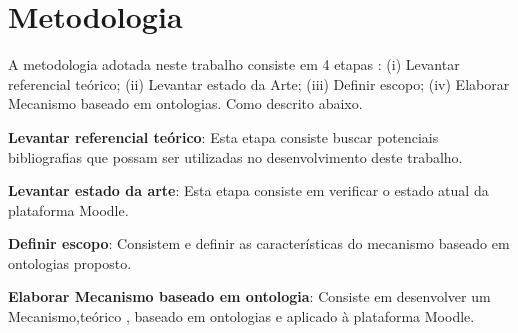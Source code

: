\section{Metodologia}
A metodologia adotada neste trabalho consiste em 4 etapas : (i) Levantar referencial teórico; (ii) Levantar estado da Arte; (iii) Definir  escopo; (iv) Elaborar  Mecanismo baseado em ontologias. Como descrito abaixo.

\textbf{Levantar referencial teórico}:
Esta etapa consiste buscar potenciais bibliografias que possam ser utilizadas no desenvolvimento deste trabalho. 

\textbf{Levantar estado da arte}: 
Esta etapa consiste em verificar o estado atual da plataforma Moodle.

\textbf{Definir escopo}: 
Consistem e definir as características do mecanismo baseado em ontologias proposto.

\textbf{Elaborar Mecanismo baseado em ontologia}:
Consiste em desenvolver um Mecanismo,teórico , baseado em ontologias e aplicado à plataforma Moodle.






%
%
%
%
%


